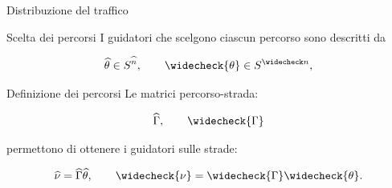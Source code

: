 \begin{frame}{Distribuzione del traffico}

\begin{block}{Scelta dei percorsi}
I guidatori che scelgono ciascun percorso sono descritti da

\[
\widehat{\theta}\in S^{\widehat n},
\qquad
\widecheck{\theta}\in S^{\widecheck n},
\]
\end{block}

\begin{block}{Definizione dei percorsi}
Le matrici percorso-strada:

\[
\widehat{\Gamma},
\qquad
\widecheck{\Gamma}
\]

permettono di ottenere i guidatori sulle strade:

\[
\widehat{\nu}
=
\widehat{\Gamma}\widehat{\theta},
\qquad
\widecheck{\nu}
=
\widecheck{\Gamma}\widecheck{\theta}.
\]
\end{block}

\end{frame}